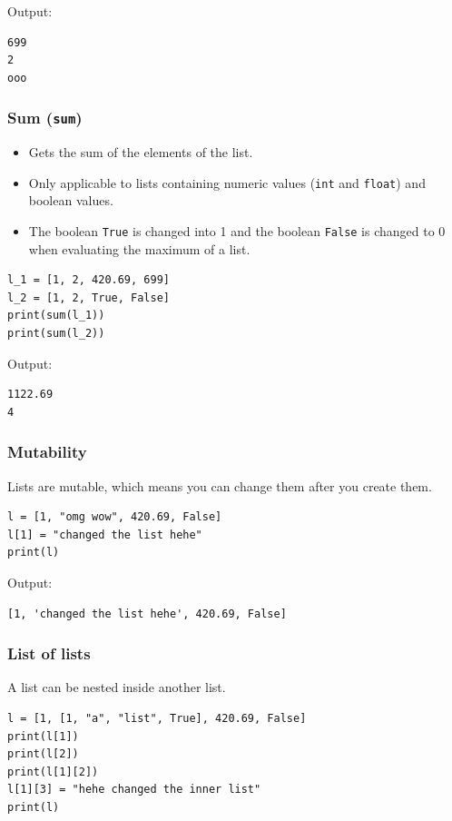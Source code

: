 \documentclass[11pt]{article}
\begin{document}
 \noindent Output:

\begin{verbatim}
699
2
ooo
\end{verbatim}

\subsubsection{Sum (\texttt{sum})}
\label{sec:org5150280}
\begin{itemize}
\item Gets the sum of the elements of the list.
\item Only applicable to lists containing numeric values (\texttt{int} and \texttt{float}) and boolean values.
\item The boolean \texttt{True} is changed into 1 and the boolean \texttt{False} is changed to 0 when evaluating the maximum of a list.
\end{itemize}

\begin{verbatim}
l_1 = [1, 2, 420.69, 699]
l_2 = [1, 2, True, False]
print(sum(l_1))
print(sum(l_2))
\end{verbatim}

 \noindent Output:

\begin{verbatim}
1122.69
4
\end{verbatim}

\subsubsection{Mutability}
\label{sec:orga696611}
Lists are mutable, which means you can change them after you create them.
\begin{verbatim}
l = [1, "omg wow", 420.69, False]
l[1] = "changed the list hehe"
print(l)
\end{verbatim}

 \noindent Output:

\begin{verbatim}
[1, 'changed the list hehe', 420.69, False]
\end{verbatim}

\subsubsection{List of lists}
\label{sec:orgcb4b42a}
A list can be nested inside another list.
\begin{verbatim}
l = [1, [1, "a", "list", True], 420.69, False]
print(l[1])
print(l[2])
print(l[1][2])
l[1][3] = "hehe changed the inner list"
print(l)
\end{verbatim}
\end{document}
